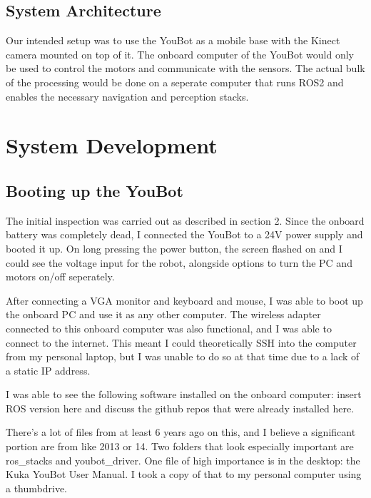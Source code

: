 \documentclass[a4paper, 12pt]{article}
\newif\ifshownotes
\newcommand{\notes}[1]{\ifshownotes\textcolor{blue}{#1}\fi}
\begin{document}
    \subsection{System Architecture}
    Our intended setup was to use the YouBot as a mobile base with the Kinect camera mounted on top of it. The onboard computer of the YouBot would only be used to control the motors and communicate with the sensors. The actual bulk of the processing would be done on a seperate computer that runs ROS2 and enables the necessary navigation and perception stacks.  

    \pagebreak

    \section{System Development}
    \subsection{Booting up the YouBot}

    \notes{describe the booting up process here, what ports to use, how to connect to the onboard computer, etc.}

    \notes{furthermore describe issues with software that needed to be fixed, such as the bashrc file, the networking, etc.}

    The initial inspection was carried out as described in section 2. Since the onboard battery was completely dead, I connected the YouBot to a 24V power supply and booted it up. On long pressing the power button, the screen flashed on and I could see the voltage input for the robot, alongside options to turn the PC and motors on/off seperately. 

    After connecting a VGA monitor and keyboard and mouse, I was able to boot up the onboard PC and use it as any other computer. The wireless adapter connected to this onboard computer was also functional, and I was able to connect to the internet. This meant I could theoretically SSH into the computer from my personal laptop, but I was unable to do so at that time due to a lack of a static IP address.


    
    I was able to see the following software installed on the onboard computer: insert ROS version here and discuss the github repos that were already installed here. 

    There’s a lot of files from at least 6 years ago on this, and I believe a significant portion are from like 2013 or 14. Two folders that look especially important are ros\_stacks and youbot\_driver. One file of high importance is in the desktop: the Kuka YouBot User Manual. I took a copy of that to my personal computer using a thumbdrive.  
    
\end{document}
